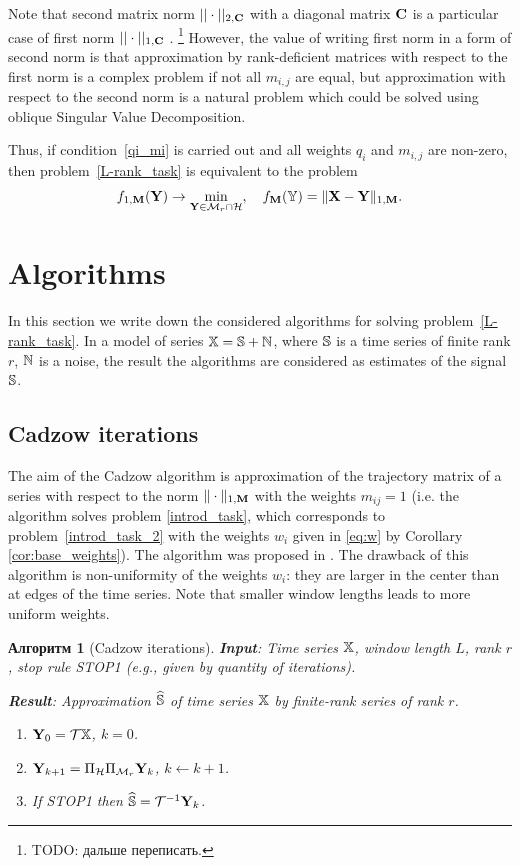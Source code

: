\documentclass[12pt,a4paper,fleqn,leqno]{article}
\newtheorem{algorithm}{Алгоритм}
\begin{document}
Note that second matrix norm $||\cdot||_{2, \mathbf{C}}$ with a diagonal matrix $\mathbf{C}$ is a particular case of first norm $||\cdot||_{1, \mathbf{C}}$ . \footnote{TODO: дальше переписать.} However, the value of writing first norm in a form of second norm is that approximation by rank-deficient matrices with respect to the first norm is a complex problem if not all $m_{i,j}$ are equal, but approximation with respect to the second norm is a natural problem which could be solved using oblique Singular Value Decomposition.

\begin{remark}
\label{rem:2tasks}
Thus, if condition~\eqref{qi_mi} is carried out and all weights $q_i$ and $m_{i,j}$ are non-zero, then problem~\eqref{L-rank_task}
is equivalent to the problem
\begin{equation}
\label{rank_task}
    f_{1,\mathbf{M}}(\mathbf{Y}) \to \min_{\mathbf{Y} \in \mathcal{M}_r \cap \mathcal{H}}, \quad f_{\mathbf{M}}(\mathbb{Y}) = \|\mathbf{X}-\mathbf{Y}\|_{1,\mathbf{M}}.
\end{equation}
\end{remark}

\section{Algorithms}
\label{sec:alg}
In this section we write down the considered algorithms for solving problem~\eqref{L-rank_task}.
In a model of series $\mathbb{X}=\mathbb{S}+\mathbb{N}$, where $\mathbb{S}$ is a time series of finite rank $r$, $\mathbb{N}$ is a noise, the result the algorithms are considered as estimates of the signal $\mathbb{S}$.

\subsection{Cadzow iterations}
The aim of the Cadzow algorithm is approximation of the trajectory matrix of a series with respect to the norm $\|\cdot\|_{1, \mathbf{M}}$ with the weights $m_{ij}=1$ (i.e. the algorithm solves problem \eqref{introd_task}, which corresponds to problem~\eqref{introd_task_2} with the weights $w_i$ given in \eqref{eq:w} by Corollary \ref{cor:base_weights}). The algorithm was proposed in \cite{Cadzow1988}. The drawback of this algorithm is non-uniformity of the weights $w_i$: they are larger in the center than at edges of the time series. Note that smaller window lengths leads to more uniform weights.
	
\begin{algorithm}[Cadzow iterations]
\textbf{Input}: Time series $\mathbb{X}$, window length $L$, rank $r$,
stop rule STOP1 (e.g., given by quantity of iterations).

\textbf{Result}:
Approximation $\widehat{\mathbb{S}}$ of time series $\mathbb{X}$ by finite-rank series of rank $r$.

\begin{enumerate}
\item
$\mathbf{Y}_0 = \mathcal{T} \mathbb{X}$, $k=0$.
\item
$\mathbf{Y}_{k+1} = \Pi_{\mathcal{H}}  \Pi_{\mathcal{M}_r} \mathbf{Y}_{k}$, $k\leftarrow k+1$.
\item
If STOP1 then $\widehat{\mathbb{S}} = \mathcal{T}^{-1} \mathbf{Y}_k$.
\end{enumerate}
\end{algorithm}
\end{document}
